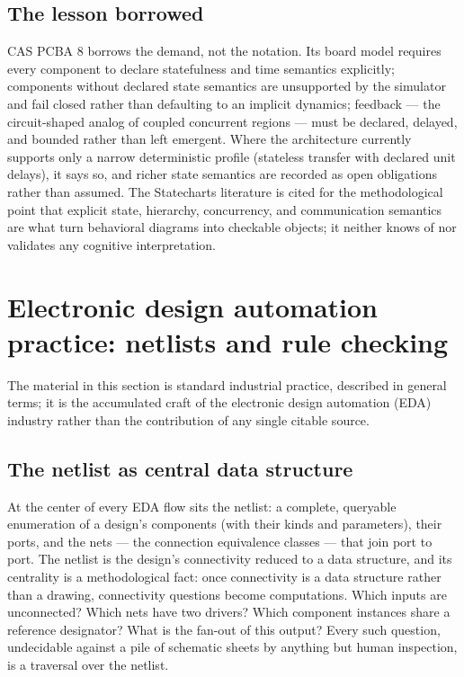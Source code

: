 \subsection{The lesson borrowed}\label{ch02:statecharts:lesson}

CAS PCBA 8 borrows the demand, not the notation. Its board model requires
every component to declare statefulness and time semantics explicitly;
components without declared state semantics are unsupported by the
simulator and fail closed rather than defaulting to an implicit dynamics;
feedback --- the circuit-shaped analog of coupled concurrent regions ---
must be declared, delayed, and bounded rather than left emergent. Where the
architecture currently supports only a narrow deterministic profile
(stateless transfer with declared unit delays), it says so, and richer
state semantics are recorded as open obligations rather than assumed. The
Statecharts literature \cite{harel} is cited for the methodological point
that explicit state, hierarchy, concurrency, and communication semantics
are what turn behavioral diagrams into checkable objects; it neither
knows of nor validates any cognitive interpretation.

\section{Electronic design automation practice: netlists and rule checking}\label{ch02:eda}

The material in this section is standard industrial practice, described in
general terms; it is the accumulated craft of the electronic design
automation (EDA) industry rather than the contribution of any single
citable source.

\subsection{The netlist as central data structure}\label{ch02:eda:netlist}

At the center of every EDA flow sits the netlist: a complete, queryable
enumeration of a design's components (with their kinds and parameters),
their ports, and the nets --- the connection equivalence classes --- that
join port to port. The netlist is the design's connectivity reduced to a
data structure, and its centrality is a methodological fact: once
connectivity is a data structure rather than a drawing, connectivity
questions become computations. Which inputs are unconnected? Which nets
have two drivers? Which component instances share a reference designator?
What is the fan-out of this output? Every such question, undecidable
against a pile of schematic sheets by anything but human inspection, is a
traversal over the netlist.

